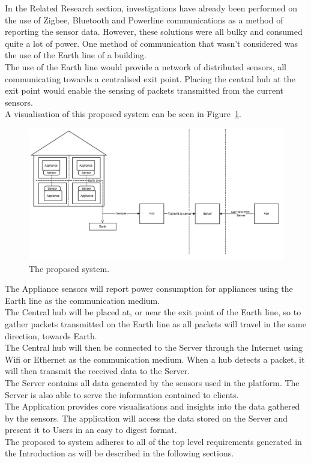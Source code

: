 \documentclass[draft,preprint,12pt,3p]{elsarticle}
\begin{document}
In the Related Research section, investigations have already been performed on the use of Zigbee, Bluetooth and Powerline communications as a method of reporting the sensor data. However, these solutions were all bulky and consumed quite a lot of power. One method of communication that wasn't considered was the use of the Earth line of a building.\\
The use of the Earth line would provide a network of distributed sensors, all communicating towards a centralised exit point. Placing the central hub at the exit point would enable the sensing of packets transmitted from the current sensors.\\
A visualisation of this proposed system can be seen in Figure~\ref{fig:proposed}.
\begin{figure}[H]
    \centering
    \includegraphics[width=\columnwidth]{diagrams/overalldescript}
    \caption {The proposed system.}
    \label{fig:proposed}
\end{figure}
The Appliance sensors will report power consumption for appliances using the Earth line as the communication medium.\\
The Central hub will be placed at, or near the exit point of the Earth line, so to gather packets transmitted on the Earth line as all packets will travel in the same direction, towards Earth.\\
The Central hub will then be connected to the Server through the Internet using Wifi or Ethernet as the communication medium. When a hub detects a packet, it will then transmit the received data to the Server.\\
The Server contains all data generated by the sensors used in the platform. The Server is also able to serve the information contained to clients.\\
The Application provides core visualisations and insights into the data gathered by the sensors. The application will access the data stored on the Server and present it to Users in an easy to digest format.\\
The proposed to system adheres to all of the top level requirements generated in the Introduction as will be described in the following sections.
\end{document}
